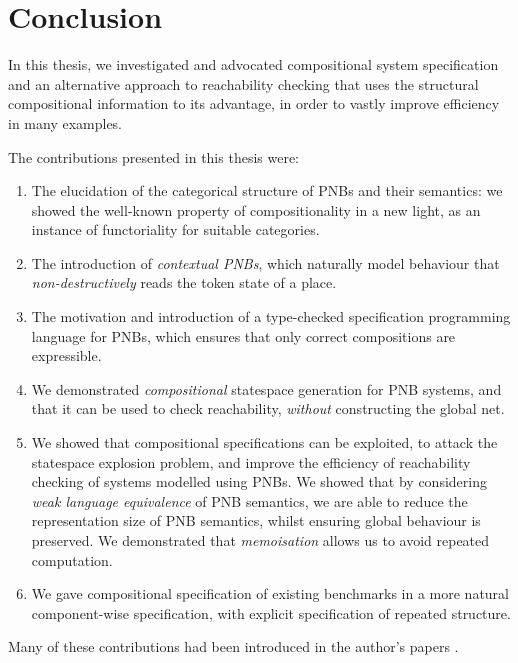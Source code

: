 \chapter{Conclusion}\label{chp:conclusion}

In this thesis, we investigated and advocated compositional system
specification and an alternative approach to reachability checking that uses
the structural compositional information to its advantage, in order to vastly
improve efficiency in many examples.

The contributions presented in this thesis were:
\begin{enumerate}
    \item The elucidation of the categorical structure of PNBs and their
        semantics: we showed the well-known property of compositionality in a
        new light, as an instance of functoriality for suitable categories.
    \item The introduction of \emph{contextual PNBs}, which naturally model
        behaviour that \emph{non-destructively} reads the token state of a
        place.
    \item The motivation and introduction of a type-checked specification
        programming language for PNBs, which ensures that only correct
        compositions are expressible.
    \item We demonstrated \emph{compositional} statespace generation for PNB
        systems, and that it can be used to check reachability, \emph{without}
        constructing the global net.
    \item We showed that compositional specifications can be exploited, to
        attack the statespace explosion problem, and improve the efficiency of
        reachability checking of systems modelled using PNBs. We showed that by
        considering \emph{weak language equivalence} of PNB semantics, we are
        able to reduce the representation size of PNB semantics, whilst
        ensuring global behaviour is preserved. We demonstrated that
        \emph{memoisation} allows us to avoid repeated computation.
    \item We gave compositional specification of existing benchmarks in a more
        natural component-wise specification, with  explicit specification of
        repeated structure.
\end{enumerate}
Many of these contributions had been introduced in the author's papers
\cite{Sobocinski2013,Sobocinski2014,Rathke2014}.


